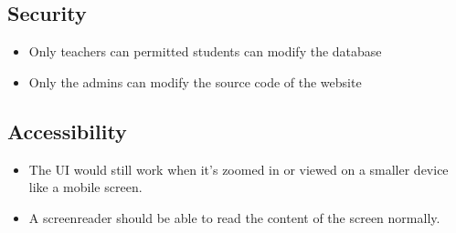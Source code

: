 \documentclass[
]{article}
\providecommand{\tightlist}{%
  \setlength{\itemsep}{0pt}\setlength{\parskip}{0pt}}
\begin{document}
\hypertarget{security}{%
\subsection{Security}\label{security}}

\begin{itemize}
\tightlist
\item
  Only teachers can permitted students can modify the database
\item
  Only the admins can modify the source code of the website
\end{itemize}

\hypertarget{accessibility}{%
\subsection{Accessibility}\label{accessibility}}

\begin{itemize}
\tightlist
\item
  The UI would still work when it's zoomed in or viewed on a smaller
  device like a mobile screen.
\item
  A screenreader should be able to read the content of the screen
  normally.
\end{itemize}
\end{document}
